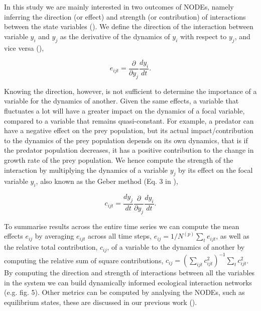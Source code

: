 \documentclass[11pt, oneside]{article}
\begin{document}
In this study we are mainly interested in two outcomes of NODEs, namely inferring the direction (or effect) and strength (or contribution) of interactions between the state variables (\cite{Bonnaffe2021a}).
We define the direction of the interaction between variable $y_i$ and $y_j$ as the derivative of the dynamics of $y_i$ with respect to $y_j$, and vice versa (\cite{Sugihara2012}), 

\vspace{-0.5cm}
\begin{equation}
    e_{ijt} = \frac{\partial}{\partial y_j} \frac{dy_i}{dt}.
\end{equation}

Knowing the direction, however, is not sufficient to determine the importance of a variable for the dynamics of another. 
Given the same effects, a variable that fluctuates a lot will have a greater impact on the dynamics of a focal variable, compared to a variable that remains quasi-constant.
For example, a predator can have a negative effect on the prey population, but its actual impact/contribution to the dynamics of the prey population depends on its own dynamics, that is if the predator population decreases, it has a positive contribution to the change in growth rate of the prey population. 
We hence compute the strength of the interaction by multiplying the dynamics of a variable $y_j$ by its effect on the focal variable $y_i$, also known as the Geber method (Eq. 3 in \cite{Hairston2005}),

\vspace{-0.5cm}
\begin{equation}
    c_{ijt} = \frac{dy_j}{dt} \frac{\partial}{\partial y_j} \frac{dy_i}{dt}.
\end{equation}

To summarise results across the entire time series we can compute the mean effects $e_{ij}$ by averaging $e_{ijt}$ across all time steps, $e_{ij} = 1/N^{(p)} \sum_t e_{ijt}$, as well as the relative total contribution, $c_{ij}$, of a variable to the dynamics of another by computing the relative sum of square contributions, $c_{ij} = \left( \sum_{ijt} c_{ijt}^{2} \right)^{-1} \sum_t c_{ijt}^2$. 
By computing the direction and strength of interactions between all the variables in the system we can build dynamically informed ecological interaction networks (e.g. fig. 5).
Other metrics can be computed by analysing the NODEs, such as equilibrium states, these are discussed in our previous work (\cite{Bonnaffe2021a}). 

\end{document}
